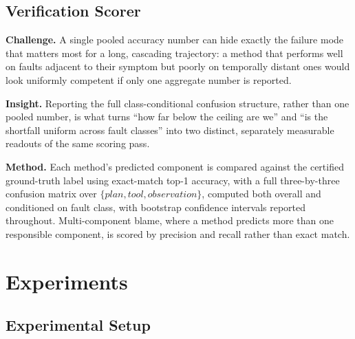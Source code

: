 \documentclass[11pt]{article}
\begin{document}
\subsection{Verification Scorer}
\textbf{Challenge.} A single pooled accuracy number can hide exactly the failure mode that matters most for a long, cascading trajectory: a method that performs well on faults adjacent to their symptom but poorly on temporally distant ones would look uniformly competent if only one aggregate number is reported.

\textbf{Insight.} Reporting the full class-conditional confusion structure, rather than one pooled number, is what turns ``how far below the ceiling are we'' and ``is the shortfall uniform across fault classes'' into two distinct, separately measurable readouts of the same scoring pass.

\textbf{Method.} Each method's predicted component is compared against the certified ground-truth label using exact-match top-1 accuracy, with a full three-by-three confusion matrix over $\{plan, tool, observation\}$, computed both overall and conditioned on fault class, with bootstrap confidence intervals reported throughout. Multi-component blame, where a method predicts more than one responsible component, is scored by precision and recall rather than exact match.

\section{Experiments}

\subsection{Experimental Setup}
\end{document}
